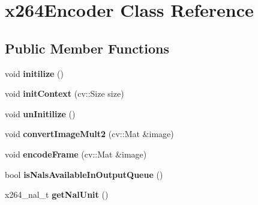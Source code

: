 \hypertarget{classx264_encoder}{}\section{x264\+Encoder Class Reference}
\label{classx264_encoder}
\subsection*{Public Member Functions}
\begin{DoxyCompactItemize}
\item 
\mbox{\label{classx264_encoder_aa22395fa21b27adb30586027411027fd}} 
void {\bfseries initilize} ()
\item 
\mbox{\label{classx264_encoder_a00e1afa895a77796f6d0089196135227}} 
void {\bfseries init\+Context} (cv\+::\+Size size)
\item 
\mbox{\label{classx264_encoder_a17e94e83f3972dee94556fcfb158542e}} 
void {\bfseries un\+Initilize} ()
\item 
\mbox{\label{classx264_encoder_a54d371368618788bbace5bb4181d33c3}} 
void {\bfseries convert\+Image\+Mult2} (cv\+::\+Mat \&image)
\item 
\mbox{\label{classx264_encoder_a859a3b4c7ffbfc4b6f0b6efe4e7bb1d5}} 
void {\bfseries encode\+Frame} (cv\+::\+Mat \&image)
\item 
\mbox{\label{classx264_encoder_a98cfd4bf02193f2642c92e94e53ec079}} 
bool {\bfseries is\+Nals\+Available\+In\+Output\+Queue} ()
\item 
\mbox{\label{classx264_encoder_a326a372408f3a33f77543d6989b3880c}} 
x264\+\_\+nal\+\_\+t {\bfseries get\+Nal\+Unit} ()
\end{DoxyCompactItemize}

